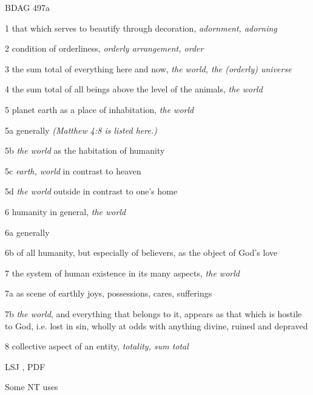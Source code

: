 				\begin{compactdesc}
					\item[BDAG 497a] \textbf{}
						\begin{compactitem}
							\item[1] that which serves to beautify through decoration, \textit{adornment, adorning}
							\item[2] condition of orderliness, \textit{orderly arrangement, order}
							\item[3] the sum total of everything here and now, \textit{the world, the (orderly) universe}
							\item[4] the sum total of all beings above the level of the animals, \textit{the world}
							\item[5] planet earth as a place of inhabitation, \textit{the world}
							\item[5a] generally \textit{(Matthew 4:8 is listed here.)}
							\item[5b] \textit{the world} as the habitation of humanity
							\item[5c] \textit{earth, world} in contrast to heaven
							\item[5d] \textit{the world} outside in contrast to one's home
							\item[6] humanity in general, \textit{the world}
							\item[6a] generally
							\item[6b] of all humanity, but especially of believers, as the object of God's love
							\item[7] the system of human existence in its many aspects, \textit{the world}
							\item[7a] as scene of earthly joys, possessions, cares, sufferings
							\item[7b] \textit{the world}, and everything that belongs to it, appears as that which is hostile to God, i.e. lost in sin, wholly at odds with anything divine, ruined and depraved
							\item[8] collective aspect of an entity, \textit{totality, sum total}
						\end{compactitem}
					\item[LSJ , PDF ] \textbf{}
						\begin{compactitem}
							\item 
						\end{compactitem}
				\end{compactdesc}
				
				\begin{compactdesc}
					\item[Some NT uses] \textbf{}
						\begin{compactdesc}
							\item[]
						\end{compactdesc}
				\end{compactdesc}
				
